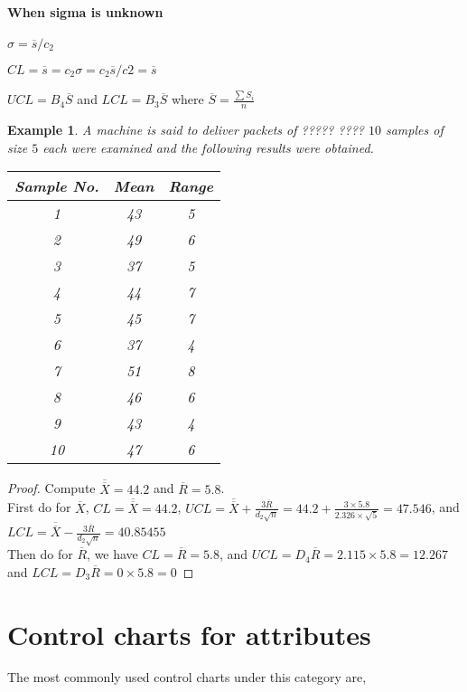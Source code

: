 \documentclass[oneside,11pt,pdftex]{book}%
\numberwithin{equation}{section}
\newtheorem{example}[theorem]{Example}
\numberwithin{section}{chapter}
\numberwithin{equation}{chapter}
\begin{document}
\paragraph{When sigma is unknown}
$ \hat{\sigma}=\overline{s}/c_2 $

$ CL=\overline{s}=c_2\sigma=c_2 \overline{s}/c2=\overline{s} $ 

$ UCL=B_4 \overline{S} $ and $ LCL=B_3 \overline{S} $ where $ \overline{S} = \frac{\sum S_i}{n}$

\begin{example}
	A machine is said to deliver packets of ????? ???? $ 10 $ samples of size $ 5 $ each were examined and the following results were obtained.

	\begin{table}[!htb]
		\centering
		\begin{tabular}{@{}ccc@{}}
			\toprule
			Sample No. & Mean & \multicolumn{1}{l}{Range} \\ \midrule
			1 & 43 & 5 \\
			2 & 49 & 6 \\
			3 & 37 & 5 \\
			4 & 44 & 7 \\
			5 & 45 & 7 \\
			6 & 37 & 4 \\
			7 & 51 & 8 \\
			8 & 46 & 6 \\
			9 & 43 & 4 \\
			10 & 47 & 6 \\ \bottomrule
		\end{tabular}
	\end{table}

\end{example}

\begin{proof}
	Compute $ \overline{\overline{X}} = 44.2$ and $ \overline{R}=5.8 $.\\
	First do for $ \overline{X} $,
	$ CL=\overline{\overline{X}}=44.2 $, $ UCL=\overline{\overline{X}}+\frac{3\overline{R}}{d_2 \sqrt{n}}=44.2+\frac{3\times 5.8}{2.326 \times \sqrt{5}}=47.546$, and $ LCL=\overline{\overline{X}}-\frac{3 \overline{R}}{d_2 \sqrt{n}}=40.85455 $ \\
	Then do for $ \overline{R} $, we have $ CL=\overline{R} =5.8$, and $ UCL=D_4\overline{R} =2.115 \times 5.8= 12.267$ and $ LCL=D_3 \overline{R} = 0 \times 5.8=0 $
\end{proof}

\FloatBarrier
\section{Control charts for attributes}
The most commonly used control charts under this category are,
\end{document}
